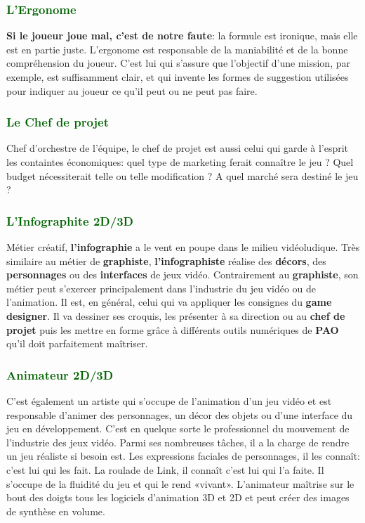 \documentclass[ebook, 8pt, oneside, openany]{memoir}
\begin{document}
	\subsubsection{\textcolor{darkgreen}{L'Ergonome}}
	\textbf{Si le joueur joue mal, c'est de notre faute}: la formule est ironique, mais elle est en partie 
	juste. L'ergonome est responsable de la maniabilité et de la bonne compréhension du joueur. C'est lui 
	qui s'assure que l'objectif d'une mission, par exemple, est suffisamment clair, et qui invente les
	formes de suggestion utilisées pour indiquer au joueur ce qu'il peut ou ne peut pas faire.
	\subsubsection{\textcolor{darkgreen}{Le Chef de projet}}
	Chef d'orchestre de l'équipe, le chef de projet est aussi celui qui garde à l'esprit les containtes 
	économiques: quel type de marketing ferait connaître le jeu ? Quel budget nécessiterait telle ou telle
	modification ? A quel marché sera destiné le jeu ?
	\subsubsection{\textcolor{darkgreen}{L'Infographite 2D/3D}}
	Métier créatif, \textbf{l'infographie} a le vent en poupe dans le milieu vidéoludique. Très similaire au
	métier de \textbf{graphiste}, \textbf{l’infographiste} réalise des \textbf{décors}, des
	\textbf{personnages} ou des \textbf{interfaces} de jeux vidéo. Contrairement au \textbf{graphiste}, son
	métier peut s’exercer principalement dans l’industrie du jeu vidéo ou de l’animation. Il est, en
	général, celui qui va appliquer les consignes du \textbf{game designer}. Il va dessiner ses croquis, les
	présenter à sa direction ou au \textbf{chef de projet} puis les mettre en forme grâce à différents
	outils numériques de \textbf{PAO} qu’il doit parfaitement maîtriser.
	\subsubsection{\textcolor{darkgreen}{Animateur 2D/3D}}
	C'est également un artiste qui s’occupe de l’animation d’un jeu vidéo et est responsable d’animer des
	personnages, un décor des objets ou d’une interface du jeu en développement. C’est en quelque sorte le
	professionnel du mouvement de l’industrie des jeux vidéo. Parmi ses nombreuses tâches, il a la charge de
	rendre un jeu réaliste si besoin est. Les expressions faciales de personnages, il les connaît: c’est lui
	qui les fait. La roulade de Link, il connaît c’est lui qui l’a faite. Il s’occupe de la fluidité du jeu
	et qui le rend «vivant». L’animateur maîtrise sur le bout des doigts tous les logiciels d’animation 3D
	et 2D et peut créer des images de synthèse en volume.
\end{document}
